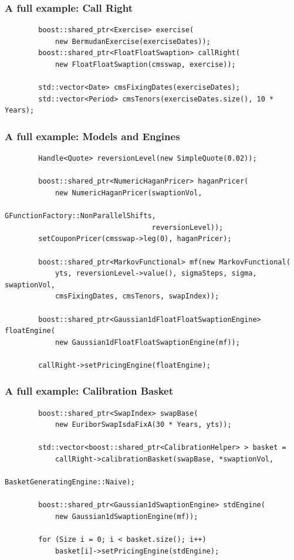 \documentclass{beamer}
\begin{document}
\begin{frame}[fragile]
\frametitle{A full example: Call Right}
\begin{verbatim}
        boost::shared_ptr<Exercise> exercise(
            new BermudanExercise(exerciseDates));
        boost::shared_ptr<FloatFloatSwaption> callRight(
            new FloatFloatSwaption(cmsswap, exercise));

        std::vector<Date> cmsFixingDates(exerciseDates);
        std::vector<Period> cmsTenors(exerciseDates.size(), 10 * Years);
\end{verbatim}
\end{frame}

\begin{frame}[fragile]
\frametitle{A full example: Models and Engines}
\begin{verbatim}
        Handle<Quote> reversionLevel(new SimpleQuote(0.02));

        boost::shared_ptr<NumericHaganPricer> haganPricer(
            new NumericHaganPricer(swaptionVol,
                                   GFunctionFactory::NonParallelShifts,
                                   reversionLevel));
        setCouponPricer(cmsswap->leg(0), haganPricer);

        boost::shared_ptr<MarkovFunctional> mf(new MarkovFunctional(
            yts, reversionLevel->value(), sigmaSteps, sigma, swaptionVol,
            cmsFixingDates, cmsTenors, swapIndex));

        boost::shared_ptr<Gaussian1dFloatFloatSwaptionEngine> floatEngine(
            new Gaussian1dFloatFloatSwaptionEngine(mf));

        callRight->setPricingEngine(floatEngine);
\end{verbatim}
\end{frame}

\begin{frame}[fragile]
\frametitle{A full example: Calibration Basket}
\begin{verbatim}
        boost::shared_ptr<SwapIndex> swapBase(
            new EuriborSwapIsdaFixA(30 * Years, yts));

        std::vector<boost::shared_ptr<CalibrationHelper> > basket =
            callRight->calibrationBasket(swapBase, *swaptionVol,
                                         BasketGeneratingEngine::Naive);

        boost::shared_ptr<Gaussian1dSwaptionEngine> stdEngine(
            new Gaussian1dSwaptionEngine(mf));

        for (Size i = 0; i < basket.size(); i++)
            basket[i]->setPricingEngine(stdEngine);
\end{verbatim}
\end{frame}
\end{document}
